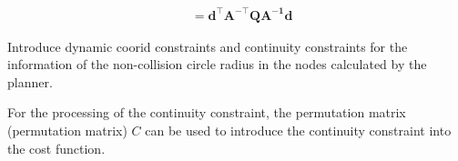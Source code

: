 \documentclass[conference]{IEEEtran}
\begin{document}
\begin{equation}
\begin{aligned}
            \\
            &= 
            \boldsymbol{d}^{\top} \boldsymbol{A}^{-\top}\boldsymbol{Q}\boldsymbol{A^{-1}}\boldsymbol{d}
        \end{aligned}
    \end{equation}

    Introduce dynamic coorid constraints and continuity constraints for the information of the non-collision circle radius in the nodes calculated by the planner.

    For the processing of the continuity constraint, the permutation matrix (permutation matrix) $C$ can be used to introduce the continuity constraint into the cost function.
    
\end{document}
